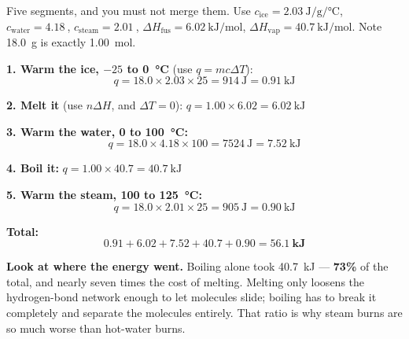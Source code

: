\documentclass{apchem-worksheet}
\begin{document}
\begin{workedexample}
Five segments, and you must not merge them. Use $c_{\text{ice}} =
\SI{2.03}{\joule\per\gram\per\celsius}$, $c_{\text{water}} =
\SI{4.18}{}$, $c_{\text{steam}} = \SI{2.01}{}$,
$\Delta H_{\text{fus}} = \SI{6.02}{\kilo\joule\per\mole}$,
$\Delta H_{\text{vap}} = \SI{40.7}{\kilo\joule\per\mole}$.
Note \SI{18.0}{\gram} is exactly \SI{1.00}{\mole}.

\textbf{1. Warm the ice, $-25$ to \SI{0}{\celsius}} (use $q = mc\Delta
T$):
\[ q = 18.0 \times 2.03 \times 25 = \SI{914}{\joule}
     = \SI{0.91}{\kilo\joule} \]

\textbf{2. Melt it} (use $n\Delta H$, and $\Delta T = 0$):
$q = 1.00 \times 6.02 = \SI{6.02}{\kilo\joule}$

\textbf{3. Warm the water, 0 to \SI{100}{\celsius}:}
\[ q = 18.0 \times 4.18 \times 100 = \SI{7524}{\joule}
     = \SI{7.52}{\kilo\joule} \]

\textbf{4. Boil it:} $q = 1.00 \times 40.7 = \SI{40.7}{\kilo\joule}$

\textbf{5. Warm the steam, 100 to \SI{125}{\celsius}:}
\[ q = 18.0 \times 2.01 \times 25 = \SI{905}{\joule}
     = \SI{0.90}{\kilo\joule} \]

\textbf{Total:}
\[ 0.91 + 6.02 + 7.52 + 40.7 + 0.90 = \mathbf{\SI{56.1}{\kilo\joule}} \]

\textbf{Look at where the energy went.} Boiling alone took
\SI{40.7}{\kilo\joule} --- \textbf{73\%} of the total, and nearly seven
times the cost of melting. Melting only loosens the hydrogen-bond
network enough to let molecules slide; boiling has to break it
completely and separate the molecules entirely. That ratio is why steam
burns are so much worse than hot-water burns.
\end{workedexample}
\end{document}
